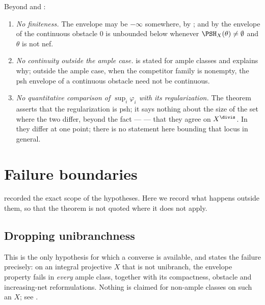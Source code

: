 \begin{remark}
\label{rem:ch45-not-given-list}
Beyond  and :
\begin{enumerate}
\item \emph{No finiteness.}  The envelope may be $-\infty$ somewhere, by
      ; and by
       the envelope of the continuous obstacle $0$
      is unbounded below whenever $\PSH_X(\theta)\ne\emptyset$ and
      $\theta$ is not nef.
\item \emph{No continuity outside the ample case.}
       is stated for ample classes and
       explains why; outside the ample case,
      when the competitor family is nonempty, the psh envelope of a
      continuous obstacle need not be continuous.
\item \emph{No quantitative comparison of $\sup_i\varphi_i$ with its
      regularization.}  The theorem asserts that the regularization is psh;
      it says nothing about the size of the set where the two differ, beyond
      the fact ---  --- that they agree on
      $X^{\divis}$.  In  they differ at one
      point; there is no statement here bounding that locus in general.
\end{enumerate}
\end{remark}

\section{Failure boundaries}
\label{sec:ch45-failure}

 recorded the exact scope of the
hypotheses.  Here we record what happens outside them, so that the theorem
is not quoted where it does not apply.

\subsection{Dropping unibranchness}
\label{sec:ch45-failure-unibranch}

This is the only hypothesis for which a converse is available, and
 states the failure precisely: on an
integral projective $X$ that is not unibranch, the envelope property fails
in \emph{every} ample class, together with its compactness, obstacle and
increasing-net reformulations.  Nothing is claimed for non-ample classes on
such an $X$; see .

